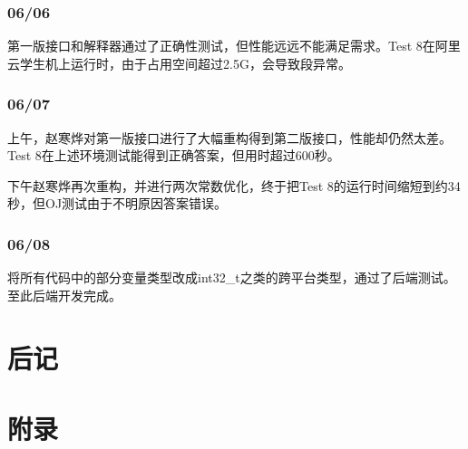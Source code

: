 \documentclass[12pt,a4paper,UTF8]{report}
\begin{document}
\subsection{06/06}
\par 第一版接口和解释器通过了正确性测试，但性能远远不能满足需求。Test 8在阿里云学生机上运行时，由于占用空间超过2.5G，会导致段异常。
\subsection{06/07}
\par 上午，赵寒烨对第一版接口进行了大幅重构得到第二版接口，性能却仍然太差。Test 8在上述环境测试能得到正确答案，但用时超过600秒。
\par 下午赵寒烨再次重构，并进行两次常数优化，终于把Test 8的运行时间缩短到约34秒，但OJ测试由于不明原因答案错误。
\subsection{06/08}
\par 将所有代码中的部分变量类型改成int32\_t之类的跨平台类型，通过了后端测试。至此后端开发完成。
\newpage
\setcounter{secnumdepth}{0}
\chapter{后记}
\newpage
\setcounter{secnumdepth}{-2}
\chapter{附录}
\end{document}
